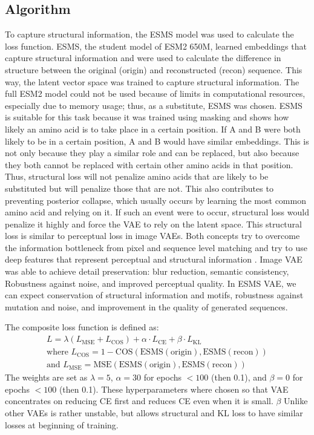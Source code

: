 \documentclass[unnumsec,webpdf,contemporary,medium]{oup-authoring-template}
\begin{document}
\subsection{Algorithm}\label{subsec:loss_arch}
To capture structural information, the ESMS model was used to calculate the loss function. ESMS, the student model of ESM2 650M, learned embeddings that capture structural information and were used to calculate the difference in structure between the original (origin) and reconstructed (recon) sequence. This way, the latent vector space was trained to capture structural information. The full ESM2 model could not be used because of limits in computational resources, especially due to memory usage; thus, as a substitute, ESMS was chosen.
ESMS is suitable for this task because it was trained using masking and shows how likely an amino acid is to take place in a certain position. If A and B were both likely to be in a certain position, A and B would have similar embeddings. This is not only because they play a similar role and can be replaced, but also because they both cannot be replaced with certain other amino acids in that position. Thus, structural loss will not penalize amino acids that are likely to be substituted but will penalize those that are not. This also contributes to preventing posterior collapse, which usually occurs by learning the most common amino acid and relying on it. If such an event were to occur, structural loss would penalize it highly and force the VAE to rely on the latent space. This structural loss is similar to perceptual loss in image VAEs. Both concepts try to overcome the information bottleneck from pixel and sequence level matching and try to use deep features that represent perceptual and structural information \cite{johnson2016perceptual}. Image VAE was able to achieve detail preservation: blur reduction, semantic consistency, Robustness against noise, and improved perceptual quality. In ESMS VAE, we can expect conservation of structural information and motifs, robustness against mutation and noise, and improvement in the quality of generated sequences.

The composite loss function is defined as:
\begin{gather}
L = \lambda (L_{\text{MSE}} + L_{\text{COS}}) + \alpha \cdot L_{\text{CE}} + \beta \cdot L_{\text{KL}} \\
\text{where } L_{\text{COS}} = 1 - \text{COS}(\text{ESMS}(\text{origin}), \text{ESMS}(\text{recon})) \nonumber \\
\text{and } L_{\text{MSE}} = \text{MSE}(\text{ESMS}(\text{origin}), \text{ESMS}(\text{recon})) \nonumber
\end{gather}
The weights are set as $\lambda=5$, $\alpha=30$ for epochs $< 100$ (then 0.1), and $\beta=0$ for epochs $< 100$ (then 0.1). These hyperparameters where chosen so that VAE concentrates on reducing CE first and reduces CE even when it is small. $\beta$ Unlike other VAEs is rather unstable, but allows structural and KL loss to have similar losses at beginning of training.
\end{document}
